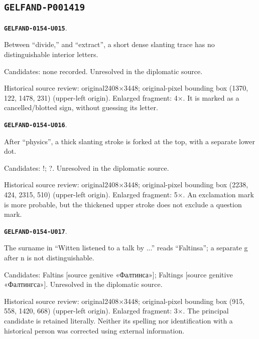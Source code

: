 \documentclass[11pt]{article}
\theoremstyle{definition}
\theoremstyle{remark}
\begin{document}
\subsection*{\texttt{GELFAND-P001419}}
\par\noindent\leavevmode{}\label{GELFAND-0154-U015}\label{GELFAND-P001419:nb-cancelled-letter:note}\textbf{\texttt{GELFAND-0154-U015}}.\nopagebreak[4]\par
Between “divide,” and “extract”, a short dense slanting trace has no distinguishable interior letters.\par
Candidates: none recorded. Unresolved in the diplomatic source.\par
Historical source review: original2408×3448; original-pixel bounding box (1370, 122, 1478, 231) (upper-left origin). Enlarged fragment: 4×. It is marked as a cancelled/blotted sign, without guessing its letter.\par\medskip
\par\noindent\leavevmode{}\label{GELFAND-0154-U016}\label{GELFAND-P001419:heading-last-sign:note}\textbf{\texttt{GELFAND-0154-U016}}.\nopagebreak[4]\par
After “physics”, a thick slanting stroke is forked at the top, with a separate lower dot.\par
Candidates: !; ?. Unresolved in the diplomatic source.\par
Historical source review: original2408×3448; original-pixel bounding box (2238, 424, 2315, 510) (upper-left origin). Enlarged fragment: 5×. An exclamation mark is more probable, but the thickened upper stroke does not exclude a question mark.\par\medskip
\par\noindent\leavevmode{}\label{GELFAND-0154-U017}\label{GELFAND-P001419:faltings-name:note}\textbf{\texttt{GELFAND-0154-U017}}.\nopagebreak[4]\par
The surname in “Witten listened to a talk by ...” reads “Faltinsa”; a separate g after n is not distinguishable.\par
Candidates: Faltins [source genitive «Фалтинса»]; Faltings [source genitive «Фалтингса»]. Unresolved in the diplomatic source.\par
Historical source review: original2408×3448; original-pixel bounding box (915, 558, 1420, 668) (upper-left origin). Enlarged fragment: 3×. The principal candidate is retained literally. Neither its spelling nor identification with a historical person was corrected using external information.\par\medskip
\end{document}
